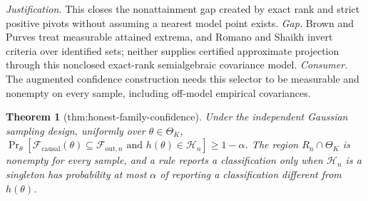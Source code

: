 \documentclass{article}
\newtheorem{theorem}{Theorem}
\begin{document}
\par\smallskip\noindent \textit{Justification.} This closes the nonattainment gap created by exact rank and strict positive pivots without assuming a nearest model point exists. \textit{Gap.} Brown and Purves treat measurable attained extrema, and Romano and Shaikh invert criteria over identified sets; neither supplies certified approximate projection through this nonclosed exact-rank semialgebraic covariance model. \textit{Consumer.} The augmented confidence construction needs this selector to be measurable and nonempty on every sample, including off-model empirical covariances.

\begin{theorem}[thm:honest-family-confidence]\label{thm:honest-family-confidence}
Under the independent Gaussian sampling design, uniformly over \(\theta\in\Theta_K\), \(\Pr_{\theta}[\mathcal F_{\mathrm{causal}}(\theta)\subseteq\mathcal F_{\mathrm{out},n}\text{ and }h(\theta)\in\mathcal H_n]\ge1-\alpha\).  The region \(R_n\cap\Theta_K\) is nonempty for every sample, and a rule reports a classification only when \(\mathcal H_n\) is a singleton has probability at most \(\alpha\) of reporting a classification different from \(h(\theta)\).
\end{theorem}
\end{document}
